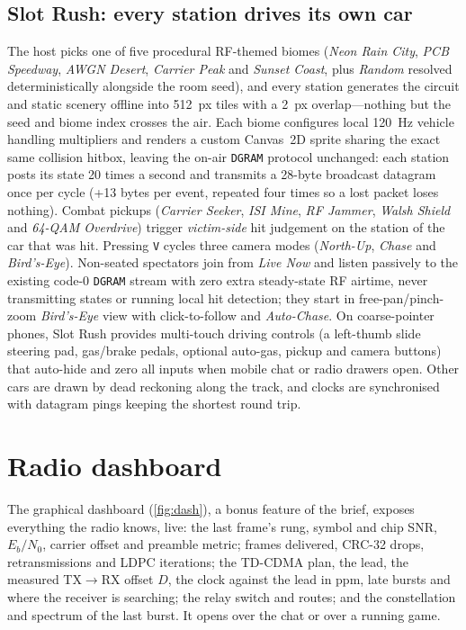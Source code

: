 \documentclass[11pt,a4paper,oneside]{report}
\newcommand{\code}[1]{\texttt{\small #1}}
\newcommand{\EbNo}{\ensuremath{E_b/N_0}}
\begin{document}
\subsection{Slot Rush: every station drives its own car}
The host picks one of five procedural RF-themed biomes (\emph{Neon Rain City}, \emph{PCB Speedway},
\emph{AWGN Desert}, \emph{Carrier Peak} and \emph{Sunset Coast}, plus \emph{Random} resolved
deterministically alongside the room seed), and every station generates the circuit and static scenery offline
into \SI{512}{px} tiles with a \SI{2}{px} overlap---nothing but the seed and biome index crosses the air. Each
biome configures local \SI{120}{Hz} vehicle handling multipliers and renders a custom Canvas~2D sprite sharing
the exact same collision hitbox, leaving the on-air \code{DGRAM} protocol unchanged: each station posts its state
20 times a second and transmits a 28-byte broadcast datagram once per cycle (+13 bytes per event, repeated
four times so a lost packet loses nothing). Combat pickups (\emph{Carrier Seeker}, \emph{ISI Mine},
\emph{RF Jammer}, \emph{Walsh Shield} and \emph{64-QAM Overdrive}) trigger \emph{victim-side} hit
judgement on the station of the car that was hit. Pressing \code{V} cycles three camera modes
(\emph{North-Up}, \emph{Chase} and \emph{Bird's-Eye}). Non-seated spectators join from \emph{Live Now} and
listen passively to the existing code-0 \code{DGRAM} stream with zero extra steady-state RF airtime, never
transmitting states or running local hit detection; they start in free-pan/pinch-zoom \emph{Bird's-Eye} view with
click-to-follow and \emph{Auto-Chase}. On coarse-pointer phones, Slot Rush provides multi-touch driving
controls (a left-thumb slide steering pad, gas/brake pedals, optional auto-gas, pickup and camera buttons) that
auto-hide and zero all inputs when mobile chat or radio drawers open. Other cars are drawn by dead reckoning
along the track, and clocks are synchronised with datagram pings keeping the shortest round trip.

\section{Radio dashboard}\label{sec:dash}
The graphical dashboard (\cref{fig:dash}), a bonus feature of the brief, exposes everything the radio
knows, live: the last frame's rung, symbol and chip SNR, \EbNo, carrier offset and preamble metric;
frames delivered, CRC-32 drops, retransmissions and LDPC iterations; the TD-CDMA plan, the lead, the
measured TX$\to$RX offset $D$, the clock against the lead in ppm, late bursts and where the receiver is
searching; the relay switch and routes; and the constellation and spectrum of the last burst. It opens
over the chat or over a running game.
\end{document}
